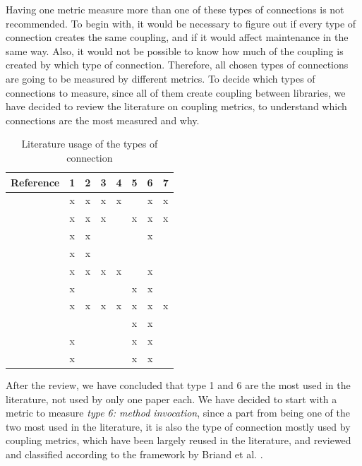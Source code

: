 \documentclass[a4paper]{article}
\begin{document}
Having one metric measure more than one of these types of connections is not recommended. To begin with, it would be necessary to figure out if every type of connection creates the same coupling, and if it would affect maintenance in the same way. Also, it would not be possible to know how much of the coupling is created by which type of connection. Therefore, all chosen types of connections are going to be measured by different metrics. To decide which types of connections to measure, since all of them create coupling between libraries, we have decided to review the literature on coupling metrics, to understand which connections are the most measured and why.

\begin{table}[ht!]
    \centering
    \begin{tabular}{|l|c|c|c|c|c|c|c|}
         \hline
         Reference                      & 1 & 2 & 3 & 4 & 5 & 6 & 7 \\\hline
         \cite{eder1994coupling}        & x & x & x & x &   & x & x \\\hline
         \cite{hitz1995measuring}       & x & x & x &   & x & x & x \\\hline
         \cite{briand1997investigation} & x & x &   &   &   & x &   \\\hline
         \cite{wilkie2000coupling}      & x & x &   &   &   &   &   \\\hline
         \cite{yang2005detecting}       & x & x & x & x &   & x &   \\\hline
         \cite{gui2007ranking}          & x &   &   &   & x & x &   \\\hline
         \cite{gupta2009package}        & x & x & x & x & x & x & x \\\hline
         \cite{harrison1998coupling}    &   &   &   &   & x & x &   \\\hline
         \cite{du2004refactoring}       & x &   &   &   & x & x &   \\\hline
         \cite{koetter2019assessing}    & x &   &   &   & x & x &   \\\hline
    \end{tabular}
    \caption{Literature usage of the types of connection}
    \label{tab:type-con-literature}
\end{table}

 After the review, we have concluded that type 1 and 6 are the most used in the literature, not used by only one paper each. We have decided to start with a metric to measure \textit{type 6: method invocation}, since a part from being one of the two most used in the literature, it is also the type of connection mostly used by coupling metrics, which have been largely reused in the literature, and reviewed and classified according to the framework by Briand et al. \cite{briand1999unified}.
\end{document}
